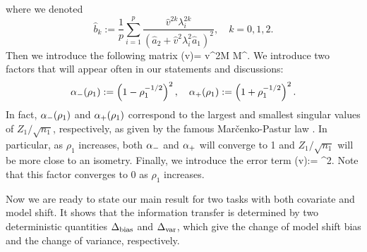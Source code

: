 where we denoted
$$\hat b_k:= \frac1{p}\sum_{i=1}^p \frac{\hat v^{2k} \lambda_i^{2k}}{ (\hat a_2 +\hat v^2 \lambda_i^2\hat a_1)^2  },\quad k=0,1,2.$$
Then we introduce the following matrix
\be\label{defnpihat}\Pi \equiv \Pi(\hat v)= \cdot \hat v^2{M}  {M}^{\top}.\ee
We introduce two factors that will appear often in our statements and discussions:
$$\alpha_-(\rho_1):=\left(1- \rho_1^{-1/2}\right)^2,\quad \alpha_+(\rho_1):=\left(1 + \rho_1^{-1/2}\right)^2.$$ 
In fact, $\alpha_-(\rho_1)$ and $\alpha_+(\rho_1)$ correspond to the largest and smallest singular values of $Z_1/\sqrt{n_1}$, respectively, as given by the famous Mar{\v c}enko-Pastur law \cite{MP}. In particular, as $\rho_1$ increases, both $\alpha_-$ and $\alpha_+$ will converge to 1 and $Z_1/\sqrt{n_1}$ will be more close to an isometry. Finally, we introduce the error term  
\be\label{eq_deltaextra}\delta\equiv \delta(\hat v):= \cdot  {}^2.\ee
Note that this factor converges to 0 as $\rho_1$ increases.


Now we are ready to state our main result for two tasks with both covariate and model shift. It shows that the information transfer is determined by two deterministic quantities $\Delta_{\text{bias}}$ and $\Delta_{\text{var}}$, which give the change of model shift bias and the change of variance, respectively.




